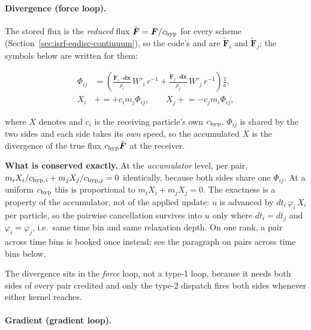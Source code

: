 \paragraph{Divergence (force loop).} The stored flux is the
\emph{reduced} flux $\tilde{\boldsymbol{F}} = \boldsymbol{F}/c_{\rm hyp}$ for every
scheme (Section~\ref{sec:isrf-eqdisc-continuum}), so the code's  and
 are $\tilde{\boldsymbol{F}}_i$ and $\tilde{\boldsymbol{F}}_j$; the
symbols below are written for them:

\begin{align}
  \Phi_{ij} &= \left(
    \frac{\tilde{\boldsymbol{F}}_i\!\cdot\!\boldsymbol{dx}}{\rho_i}\,W'_i\,r^{-1}
    + \frac{\tilde{\boldsymbol{F}}_j\!\cdot\!\boldsymbol{dx}}{\rho_j}\,W'_j\,r^{-1}
  \right)\frac{1}{a},
  \label{eq:isrfd-div-phi} \\
  X_i &\mathrel{+}= + c_i m_j \Phi_{ij}, \qquad
  X_j \mathrel{+}= - c_j m_i \Phi_{ij},
  \label{eq:isrfd-div-apply}
\end{align}

where $X$ denotes  and $c_i$ is the receiving particle's
own $c_{\rm hyp}$. $\Phi_{ij}$ is shared by the two sides and each side takes its
\emph{own} speed, so the accumulated $X$ is the divergence of the true flux
$c_{\rm hyp}\tilde{\boldsymbol{F}}$ at the receiver.

\textbf{What is conserved exactly.} At the \emph{accumulator} level, per pair,
$m_i X_i / c_{{\rm hyp},i} + m_j X_j / c_{{\rm hyp},j} = 0$ identically,
because both sides share one $\Phi_{ij}$. At a uniform
$c_{\rm hyp}$ this is proportional to $m_i X_i + m_j X_j = 0$. The exactness is
a property of the accumulator, not of the applied update: $u$ is advanced by
$dt_i\,\varphi_i\,X_i$ per particle, so the
pairwise cancellation survives into $u$ only where $dt_i = dt_j$ and
$\varphi_i = \varphi_j$, i.e.\ same time bin and same relaxation depth. On one
rank, a pair across time bins is booked once instead; see the paragraph on
pairs across time bins below.

The divergence sits in the \emph{force} loop, not a type-1 loop, because it needs
both sides of every pair credited and only the type-2 dispatch fires both sides
whenever either kernel reaches.

\paragraph{Gradient (gradient loop).}

